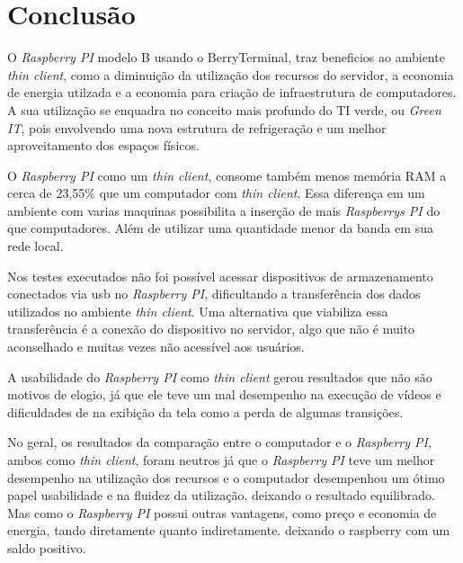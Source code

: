 \documentclass[
	12pt,				%
	openright,			%
	twoside,			%
	a4paper,			%
	chapter=TITLE,		%
	english,			%
	brazil				%
	]{abntex2}
\begin{document}





\chapter{Conclusão}

O \textit{Raspberry PI} modelo B usando o BerryTerminal, traz beneficios ao ambiente \textit{thin client}, como a diminuição da utilização dos recursos do servidor, a economia de energia utilzada e a economia para criação de infraestrutura de computadores. A sua utilização se enquadra no conceito mais profundo do TI verde, ou \textit{Green IT}, pois envolvendo uma nova estrutura de refrigeração e um melhor aproveitamento dos espaços físicos. 

O \textit{Raspberry PI} como um \textit{thin client}, consome também menos memória RAM a cerca de 23,55\% que um computador com \textit{thin client}. Essa diferença em um ambiente com varias maquinas possibilita a inserção de mais \textit{Raspberrys PI} do que computadores. Além de utilizar uma quantidade menor da banda em sua rede local.

Nos testes executados não foi possível acessar dispositivos de armazenamento conectados via usb no \textit{Raspberry PI}, dificultando a transferência dos dados utilizados no ambiente \textit{thin client}. Uma alternativa que viabiliza essa transferência é a conexão do dispositivo no servidor, algo que não é muito aconselhado e muitas vezes não acessível aos usuários.

A usabilidade do \textit{Raspberry PI} como \textit{thin client} gerou resultados que não são motivos de elogio, já que ele teve um mal desempenho na execução de vídeos e dificuldades de na exibição da tela como a perda de algumas transições.

No geral, os resultados da comparação entre o computador e o \textit{Raspberry PI}, ambos como \textit{thin client}, foram neutros já que o \textit{Raspberry PI} teve um melhor desempenho na utilização dos recursos e o computador desempenhou um ótimo papel usabilidade e na fluidez da utilização. deixando o resultado equilibrado. Mas como o \textit{Raspberry PI} possui outras vantagens, como preço e economia de energia, tando diretamente quanto indiretamente. deixando o raspberry com um saldo positivo.
\end{document}
